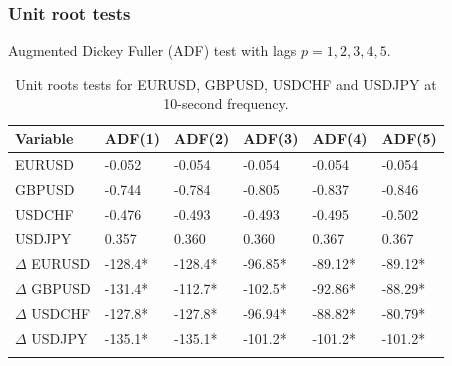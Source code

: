 \documentclass{beamer}
\begin{document}
%
%
\begin{frame}
\frametitle{Unit root tests}
Augmented Dickey Fuller (ADF) test with lags $p=1,2,3,4,5$.
\begin{table}[ht]
\centering
\small
\begin{tabular}{llllll}
\toprule
{Variable} & {ADF(1)} & {ADF(2)} & {ADF(3)} & {ADF(4)} & {ADF(5)}\\ 
\midrule
EURUSD &  -0.052   & -0.054  & -0.054  & -0.054  & -0.054  \\
GBPUSD &  -0.744  & -0.784  & -0.805  & -0.837  & -0.846  \\
USDCHF &  -0.476   & -0.493  & -0.493  & -0.495  & -0.502  \\
USDJPY &  0.357   & 0.360  & 0.360  & 0.367  & 0.367  \\
$\Delta$ EURUSD & -128.4*  & -128.4*  & -96.85* & -89.12*   & -89.12*\\
$\Delta$ GBPUSD & -131.4*  & -112.7*  & -102.5* & -92.86*   & -88.29*\\
$\Delta$ USDCHF & -127.8*  & -127.8*  & -96.94* & -88.82*   & -80.79*\\
$\Delta$ USDJPY & -135.1*  & -135.1*  & -101.2* & -101.2*   & -101.2*\\
\bottomrule
\addlinespace[1ex]
\end{tabular}
\caption{Unit roots tests for EURUSD, GBPUSD, USDCHF and USDJPY at 10-second
frequency.}
\label{tab:adf}
\end{table}
\end{frame}
\end{document}
